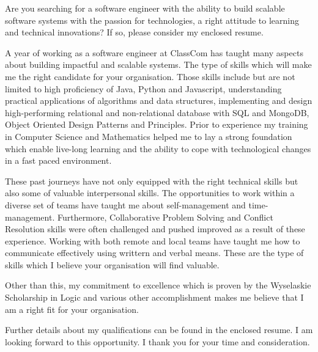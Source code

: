 \documentclass[10pt,stdletter,dateno,sigleft]{newlfm} %
\begin{document}
\begin{newlfm}


Are you searching for a software engineer with the ability to build scalable software systems with the passion for technologies, a right attitude to learning and technical innovations? If so, please consider my enclosed resume.

A year of working as a software engineer at ClassCom has taught many aspects about building impactful and scalable systems. The type of skills which will make me the right candidate for your organisation. Those skills include but are not limited to high proficiency of Java, Python and Javascript, understanding practical applications of algorithms and data structures, implementing and design high-performing relational and non-relational database with SQL and MongoDB, Object Oriented Design Patterns and Principles. Prior to experience my training in Computer Science and Mathematics helped me to lay a strong foundation which enable live-long learning and the ability to cope with technological changes in a fast paced environment.
 
These past journeys have not only equipped with the right technical skills but also some of valuable interpersonal skills. The opportunities to work within a diverse set of teams have taught me about self-management and time-management. Furthermore, Collaborative Problem Solving and Conflict Resolution skills were often challenged and pushed improved as a result of these experience. Working with both remote and local teams have taught me how to communicate effectively using writtern and verbal means. These are the type of skills which I believe your organisation will find valuable.

Other than this, my commitment to excellence which is proven by the Wyselaskie Scholarship in Logic and various other accomplishment makes me believe that I am a right fit for your organisation.

Further details about my qualifications can be found in the enclosed resume. I am looking forward to this opportunity. I thank you for your time and consideration.

\end{newlfm}
\end{document}
